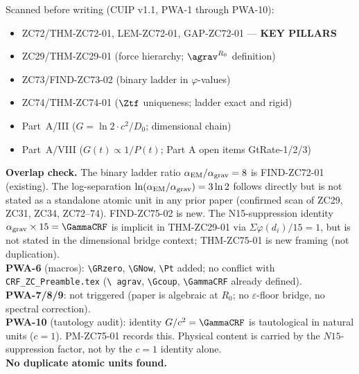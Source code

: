 \documentclass[12pt, a4paper]{article}
\begin{document}
\begin{formalbox}[title={Pre-Work Audit Record --- ZC75}]
Scanned before writing (CUIP v1.1, PWA-1 through PWA-10):
\begin{itemize}[leftmargin=2em, noitemsep]
  \item ZC72/THM-ZC72-01, LEM-ZC72-01, GAP-ZC72-01 --- \textbf{KEY PILLARS}
  \item ZC29/THM-ZC29-01 (force hierarchy; $\agrav^{R_0}$ definition)
  \item ZC73/FIND-ZC73-02 (binary ladder in $\varphi$-values)
  \item ZC74/THM-ZC74-01 ($\Ztf$ uniqueness; ladder exact and rigid)
  \item Part~A/III ($G = \ln2 \cdot c^2/D_0$; dimensional chain)
  \item Part~A/VIII ($G(t) \propto 1/P(t)$; Part A open items GtRate-1/2/3)
\end{itemize}

\textbf{Overlap check.}
The binary ladder ratio $\alpha_{\rm EM}/\alpha_{\rm grav} = 8$
is FIND-ZC72-01 (existing).
The log-separation $\ln(\alpha_{\rm EM}/\alpha_{\rm grav}) = 3\ln2$
follows directly but is not stated as a standalone atomic unit
in any prior paper (confirmed scan of ZC29, ZC31, ZC34, ZC72--74).
FIND-ZC75-02 is new.
The N15-suppression identity $\alpha_{\rm grav} \times 15 = \GammaCRF$
is implicit in THM-ZC29-01 via $\Sigma \varphi(d_i)/15 = 1$, but
is not stated in the dimensional bridge context; THM-ZC75-01
is new framing (not duplication).\\
\textbf{PWA-6} (macros): \texttt{\textbackslash GRzero},
\texttt{\textbackslash GNow}, \texttt{\textbackslash Pt} added; no
conflict with \texttt{CRF\_ZC\_Preamble.tex} (\texttt{\textbackslash
agrav}, \texttt{\textbackslash Gcoup}, \texttt{\textbackslash GammaCRF}
already defined).\\
\textbf{PWA-7/8/9}: not triggered (paper is algebraic at $R_0$;
no $\varepsilon$-floor bridge, no spectral correction).\\
\textbf{PWA-10} (tautology audit): identity $G/c^2 = \GammaCRF$
is tautological in natural units ($c=1$). PM-ZC75-01 records this.
Physical content is carried by the $N15$-suppression factor,
not by the $c=1$ identity alone.\\
\textbf{No duplicate atomic units found.}
\end{formalbox}

\newpage

\end{document}
